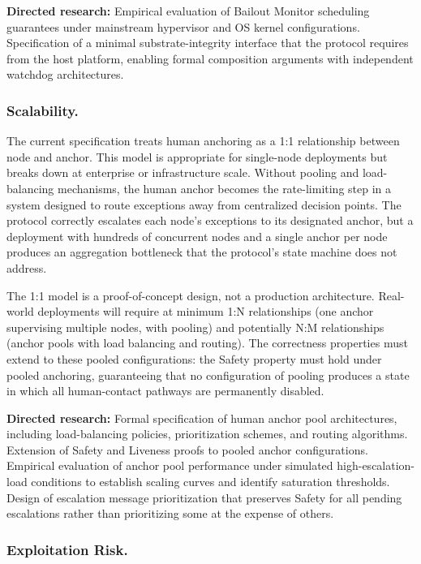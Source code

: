 \textbf{Directed research:} Empirical evaluation of Bailout Monitor scheduling guarantees under mainstream hypervisor and OS kernel configurations. Specification of a minimal substrate-integrity interface that the protocol requires from the host platform, enabling formal composition arguments with independent watchdog architectures.

\subsubsection{Scalability.}

The current specification treats human anchoring as a 1:1 relationship between node and anchor. This model is appropriate for single-node deployments but breaks down at enterprise or infrastructure scale. Without pooling and load-balancing mechanisms, the human anchor becomes the rate-limiting step in a system designed to route exceptions away from centralized decision points. The protocol correctly escalates each node's exceptions to its designated anchor, but a deployment with hundreds of concurrent nodes and a single anchor per node produces an aggregation bottleneck that the protocol's state machine does not address.

The 1:1 model is a proof-of-concept design, not a production architecture. Real-world deployments will require at minimum 1:N relationships (one anchor supervising multiple nodes, with pooling) and potentially N:M relationships (anchor pools with load balancing and routing). The correctness properties must extend to these pooled configurations: the Safety property must hold under pooled anchoring, guaranteeing that no configuration of pooling produces a state in which all human-contact pathways are permanently disabled.

\textbf{Directed research:} Formal specification of human anchor pool architectures, including load-balancing policies, prioritization schemes, and routing algorithms. Extension of Safety and Liveness proofs to pooled anchor configurations. Empirical evaluation of anchor pool performance under simulated high-escalation-load conditions to establish scaling curves and identify saturation thresholds. Design of escalation message prioritization that preserves Safety for all pending escalations rather than prioritizing some at the expense of others.

\subsubsection{Exploitation Risk.}

